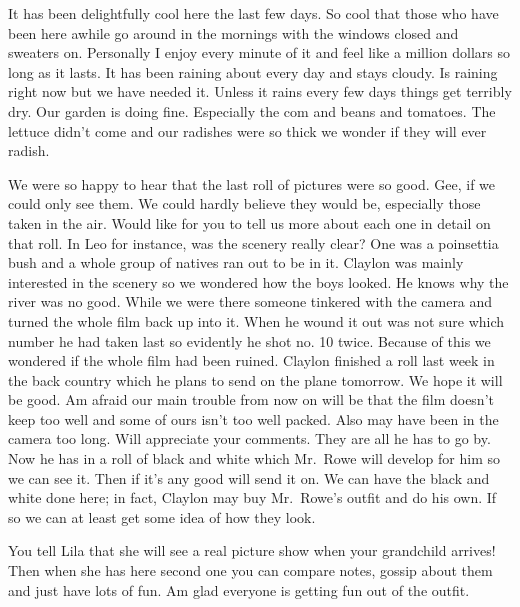 \documentclass[
]{book}
\begin{document}
It has been delightfully cool here the last few days. So cool that those who have been here awhile go around in the mornings with the windows closed and sweaters on. Personally I enjoy every minute of it and feel like a million dollars so long as it lasts. It has been raining about every day and stays cloudy. Is raining right now but we have needed it. Unless it rains every few days things get terribly dry. Our garden is doing fine. Especially the com and beans and tomatoes. The lettuce didn't come and our radishes were so thick we wonder if they will ever radish.

We were so happy to hear that the last roll of pictures were so good. Gee, if we could only see them. We could hardly believe they would be, especially those taken in the air. Would like for you to tell us more about each one in detail on that roll. In Leo for instance, was the scenery really clear? One was a poinsettia bush and a whole group of natives ran out to be in it. Claylon was mainly interested in the scenery so we wondered how the boys looked. He knows why the river was no good. While we were there someone tinkered with the camera and turned the whole film back up into it. When he wound it out was not sure which number he had taken last so evidently he shot no. 10 twice. Because of this we wondered if the whole film had been ruined. Claylon finished a roll last week in the back country which he plans to send on the plane tomorrow. We hope it will be good. Am afraid our main trouble from now on will be that the film doesn't keep too well and some of ours isn't too well packed. Also may have been in the camera too long. Will appreciate your comments. They are all he has to go by. Now he has in a roll of black and white which Mr.~Rowe will develop for him so we can see it. Then if it's any good will send it on. We can have the black and white done here; in fact, Claylon may buy Mr.~Rowe's outfit and do his own. If so we can at least get some idea of how they look.

You tell Lila that she will see a real picture show when your grandchild arrives! Then when she has here second one you can compare notes, gossip about them and just have lots of fun. Am glad everyone is getting fun out of the outfit.
\end{document}
